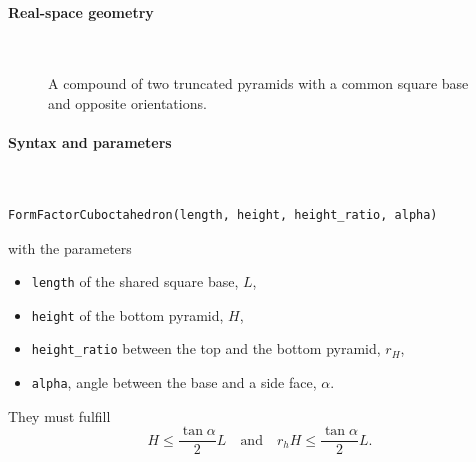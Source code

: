 \paragraph{Real-space geometry}\strut\\

\begin{figure}[H]
\hfill
{}
\hfill
{}
\hfill
{}
\hfill
\caption{A compound of two truncated pyramids with a common square base
and opposite orientations.}
\end{figure}

\FloatBarrier

\paragraph{Syntax and parameters}\strut\\[-2ex plus .2ex minus .2ex]
\begin{lstlisting}[language=python, style=eclipseboxed,numbers=none,nolol]
  FormFactorCuboctahedron(length, height, height_ratio, alpha)
\end{lstlisting}
with the parameters
\begin{itemize}
\item \texttt{length} of the shared square base, $L$,
\item \texttt{height} of the bottom pyramid, $H$,
\item \texttt{height\_ratio} between the top and the bottom pyramid, $r_H$,
\item \texttt{alpha}, angle between the base and a side face, $\alpha$.
\end{itemize}
They must fulfill
\begin{displaymath}
  H \le \frac{\tan\alpha}{2} L
  \quad\text{and}\quad
  r_h H \le \frac{\tan\alpha}{2} L.
\end{displaymath}



